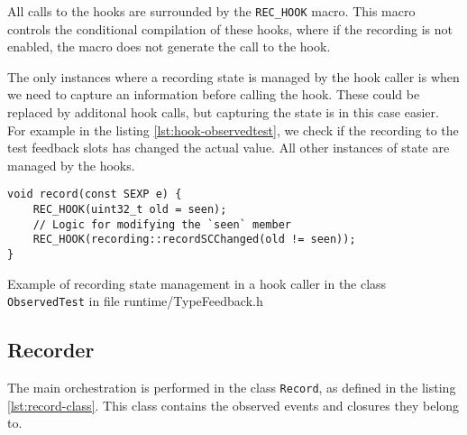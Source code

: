 All calls to the hooks are surrounded by the \texttt{REC\_HOOK} macro. This macro controls the conditional compilation of these hooks, where if the recording is not enabled, the macro does not generate the call to the hook.

The only instances where a recording state is managed by the hook caller is when we need to capture an information before calling the hook. These could be replaced by additonal hook calls, but capturing the state is in this case easier. For example in the listing \ref{lst:hook-observedtest}, we check if the recording to the test feedback slots has changed the actual value. All other instances of state are managed by the hooks.

\begin{listing}
	\centering
	\begin{verbatim}
void record(const SEXP e) {
    REC_HOOK(uint32_t old = seen);
    // Logic for modifying the `seen` member
    REC_HOOK(recording::recordSCChanged(old != seen));
}
  \end{verbatim}
	\caption{Example of recording state management in a hook caller in the class \texttt{ObservedTest} in file runtime/TypeFeedback.h}\label{lst:hook-observedtest}
\end{listing}

\subsection{Recorder}

The main orchestration is performed in the class \texttt{Record}, as defined in the listing \ref{lst:record-class}. This class contains the observed events and closures they belong to.

